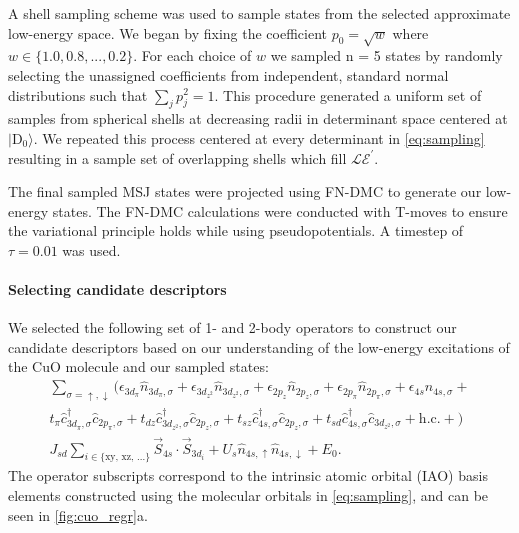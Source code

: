 \documentclass[12pt]{article}
\begin{document}
A shell sampling scheme was used to sample states from the selected approximate low-energy space.
We began by fixing the coefficient $p_0 = \sqrt{w}$ where $w \in \{1.0, 0.8, ..., 0.2\}$. 
For each choice of $w$ we sampled n = 5 states by randomly selecting the unassigned coefficients from independent, standard normal distributions such that $\sum_j p_j^2 = 1$. 
This procedure generated a uniform set of samples from spherical shells at decreasing radii in determinant space centered at $|\text{D}_0\rangle$.
We repeated this process centered at every determinant in \eqref{eq:sampling} resulting in a sample set of overlapping shells which fill $\mathcal{LE}^\prime$.

The final sampled MSJ states were projected using FN-DMC to generate our low-energy states.
The FN-DMC calculations were conducted with T-moves to ensure the variational principle holds while using pseudopotentials.
A timestep of $\tau = 0.01$ was used.

\paragraph{Selecting candidate descriptors}
We selected the following set of 1- and 2-body operators to construct our candidate descriptors based on our understanding of the low-energy excitations of the CuO molecule and our sampled states:
\begin{equation}
\begin{split}
\sum_{\sigma = \uparrow, \downarrow} \Bigg(\epsilon_{3d_\pi}\hat{n}_{3d_\pi,\sigma} + \epsilon_{3d_{z^2}}\hat{n}_{3d_{z^2},\sigma} +  \epsilon_{2p_z} \hat{n}_{2p_z,\sigma} + \epsilon_{2p_\pi}\hat{n}_{2p_\pi,\sigma} + \epsilon_{4s}\hat{n}_{4s,\sigma} +\\
t_\pi \hat{c}_{3d_\pi,\sigma}^\dagger \hat{c}_{2p_\pi,\sigma} + t_{dz} \hat{c}_{3d_{z^2},\sigma}^\dagger \hat{c}_{2p_z,\sigma}  + t_{sz}\hat{c}_{4s,\sigma}^\dagger \hat{c}_{2p_z,\sigma} + t_{sd}\hat{c}_{4s,\sigma}^\dagger \hat{c}_{3d_{z^2},\sigma} + \text{h.c.} + \Bigg)  \\
J_{sd}\sum_{i\in {\{\text{xy, xz, ...}}\}} \vec{S}_{4s} \cdot \vec{S}_{3d_i} + U_s \hat{n}_{4s,\uparrow}\hat{n}_{4s,\downarrow} + E_0.
\end{split}
\label{eq:models}
\end{equation}
The operator subscripts correspond to the intrinsic atomic orbital (IAO) basis elements constructed using the molecular orbitals in \eqref{eq:sampling}, and can be seen in \ref{fig:cuo_regr}a.
\end{document}
